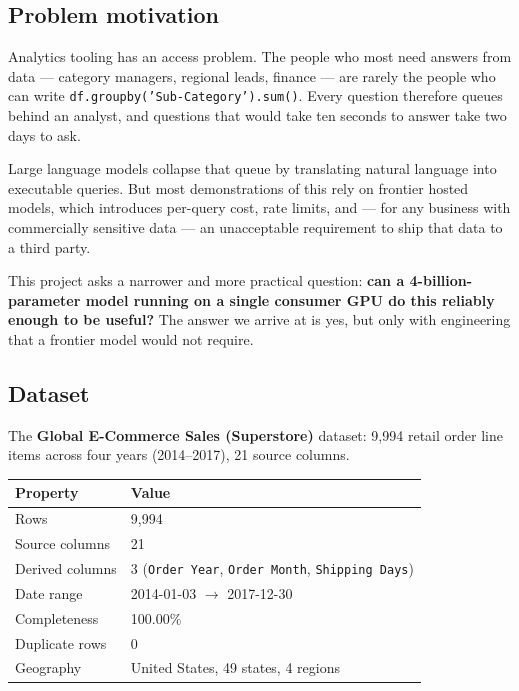 \documentclass[11pt,a4paper]{article}
\begin{document}
\subsection{Problem motivation}

Analytics tooling has an access problem. The people who most need answers from data
--- category managers, regional leads, finance --- are rarely the people who can
write \texttt{df.groupby(\allowbreak'Sub-Category')\allowbreak['Profit']\allowbreak.sum()}. Every
question therefore queues behind an analyst, and questions that would take ten seconds
to answer take two days to ask.

Large language models collapse that queue by translating natural language into
executable queries. But most demonstrations of this rely on frontier hosted models,
which introduces per-query cost, rate limits, and --- for any business with
commercially sensitive data --- an unacceptable requirement to ship that data to a
third party.

This project asks a narrower and more practical question: \textbf{can a
4-billion-parameter model running on a single consumer GPU do this reliably enough to
be useful?} The answer we arrive at is yes, but only with engineering that a frontier
model would not require.

\subsection{Dataset}
\label{sec:dataset}

The \textbf{Global E-Commerce Sales (Superstore)} dataset: 9,994 retail order line
items across four years (2014--2017), 21 source columns.

\begin{center}
\begin{tabular}{@{}ll@{}}
\toprule
\textbf{Property} & \textbf{Value} \\
\midrule
Rows              & 9,994 \\
Source columns    & 21 \\
Derived columns   & 3 (\texttt{Order Year}, \texttt{Order Month}, \texttt{Shipping Days}) \\
Date range        & 2014-01-03 $\rightarrow$ 2017-12-30 \\
Completeness      & 100.00\% \\
Duplicate rows    & 0 \\
Geography         & United States, 49 states, 4 regions \\
\bottomrule
\end{tabular}
\end{center}
\end{document}
